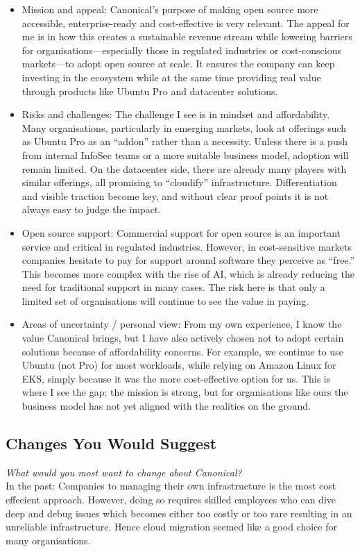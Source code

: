 \documentclass{article}
\begin{document}
\begin{itemize}
    \item Mission and appeal:
Canonical’s purpose of making open source more accessible, enterprise-ready and cost-effective is very relevant. 
The appeal for me is in how this creates a sustainable revenue stream while lowering barriers for organisations—especially 
those in regulated industries or cost-conscious markets—to adopt open source at scale. 
It ensures the company can keep investing in the ecosystem while at the same time providing real value through
 products like Ubuntu Pro and datacenter solutions.

    \item Risks and challenges:
The challenge I see is in mindset and affordability. Many organisations, particularly in emerging markets, look at offerings such as Ubuntu Pro as an “addon” rather than a necessity. Unless there is a push from internal InfoSec teams or a more suitable business model, adoption will remain limited. On the datacenter side, there are already many players with similar offerings, all promising to “cloudify” infrastructure. Differentiation and visible traction become key, and without clear proof points it is not always easy to judge the impact.

    \item Open source support:
Commercial support for open source is an important service and critical in regulated industries. However, in cost-sensitive markets companies hesitate to pay for support around software they perceive as “free.” This becomes more complex with the rise of AI, which is already reducing the need for traditional support in many cases. The risk here is that only a limited set of organisations will continue to see the value in paying.

    \item Areas of uncertainty / personal view:
From my own experience, I know the value Canonical brings, but I have also actively chosen not to adopt certain solutions because of affordability concerns. For example, we continue to use Ubuntu (not Pro) for most workloads, while relying on Amazon Linux for EKS, simply because it was the more cost-effective option for us. This is where I see the gap: the mission is strong, but for organisations like ours the business model has not yet aligned with the realities on the ground.

\end{itemize}

\subsection{Changes You Would Suggest}
\small \textit{What would you most want to change about Canonical?} 
\normalsize 
\\[1em]
In the past: Companies to managing their own infrastructure is the most cost effecient approach. However, doing so requires skilled employees
who can dive deep and debug issues which becomes either too costly or too rare resulting in an unreliable infrastructure. Hence 
cloud migration seemed like a good choice for many organisations. 
\end{document}
